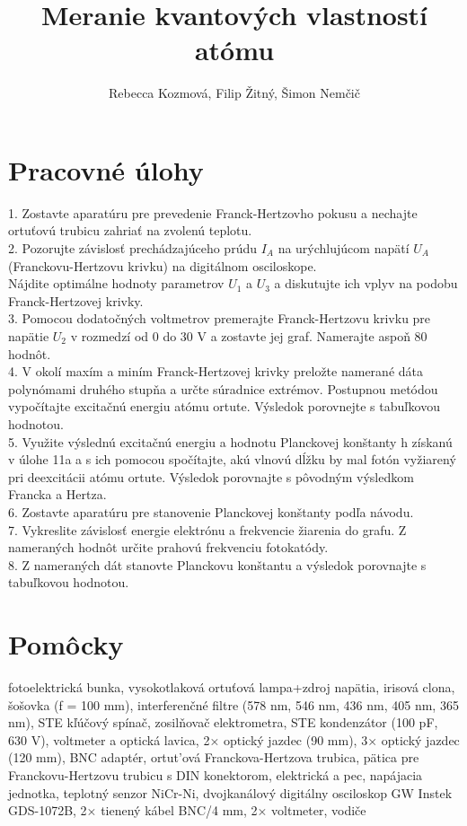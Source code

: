 \documentclass{article}
\title{Meranie kvantových vlastností atómu}
\author{Rebecca Kozmová, Filip Žitný, Šimon Nemčič}
\begin{document}
\maketitle



\section{Pracovné úlohy}
1. Zostavte aparatúru pre prevedenie Franck-Hertzovho pokusu a nechajte ortuťovú trubicu zahriať na zvolenú teplotu.\\
2. Pozorujte závislosť prechádzajúceho prúdu $I_A$ na urýchlujúcom napätí $U_A$ (Franckovu-Hertzovu krivku) na digitálnom osciloskope. \\Nájdite optimálne hodnoty parametrov $U_1$ a $U_3$ a diskutujte ich vplyv na podobu Franck-Hertzovej krivky.\\
3. Pomocou dodatočných voltmetrov  premerajte Franck-Hertzovu krivku pre napätie $U_2$ v
rozmedzí  od 0 do 30 V a zostavte jej graf. Namerajte aspoň 80 hodnôt.\\
4. V okolí maxím a miním Franck-Hertzovej krivky preložte namerané dáta polynómami  druhého
stupňa a určte súradnice  extrémov. Postupnou metódou vypočítajte  excitačnú  energiu atómu ortute. Výsledok porovnejte s tabuľkovou hodnotou.\\
5. Využite výslednú  excitačnú energiu a hodnotu Planckovej konštanty h získanú v úlohe 11a a s ich pomocou spočítajte, akú vlnovú dĺžku  by mal fotón vyžiarený pri  deexcitácii  atómu 
ortute. Výsledok porovnajte s pôvodným výsledkom Francka a Hertza.\\
6. Zostavte aparatúru pre stanovenie Planckovej konštanty podľa návodu.\\
7. Vykreslite závislosť energie elektrónu a frekvencie  žiarenia do grafu. Z nameraných hodnôt určite prahovú frekvenciu fotokatódy.\\
8. Z nameraných dát stanovte Planckovu konštantu a výsledok porovnajte s tabuľkovou hodnotou.
\section{Pomôcky}
fotoelektrická bunka, vysokotlaková ortuťová lampa+zdroj napätia, irisová clona, šošovka (f = 100 mm),
interferenčné filtre (578 nm, 546 nm, 436 nm, 405 nm, 365 nm), STE kľúčový spínač, zosilňovač elektrometra, STE kondenzátor (100 pF, 630 V), voltmeter a optická lavica, 2× optický jazdec (90 mm),
3× optický jazdec (120 mm), BNC adaptér, ortut'ová Franckova-Hertzova trubica, pätica pre Franckovu-Hertzovu trubicu s DIN konektorom, elektrická a pec, napájacia jednotka, teplotný senzor NiCr-Ni, dvojkanálový digitálny osciloskop GW
Instek GDS-1072B, 2× tienený kábel BNC/4 mm, 2× voltmeter, vodiče
\end{document}
